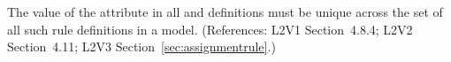The value of the  attribute in all \AssignmentRule and
\RateRule definitions must be unique across the set of all such rule
definitions in a model.  (References: L2V1 Section~4.8.4; 
L2V2 Section~4.11; L2V3 Section~\ref{sec:assignmentrule}.)
